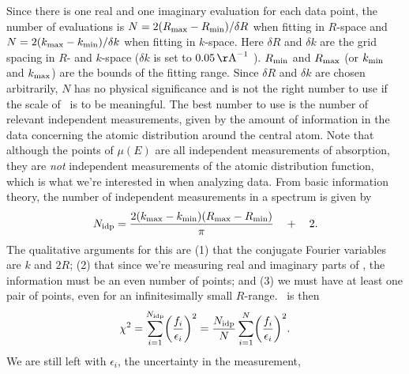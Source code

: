 Since there is one real and one imaginary evaluation for each data
point, the number of evaluations is $ N = { {2 (R_{\rm max} - R_{\rm
min})} / { \delta R } } $ when fitting in $R$-space and $ N = { {2
(k_{\rm max} - k_{\rm min})} / {\delta k } } $ when fitting in
$k$-space.  Here $\delta R$ and $\delta k$ are the grid spacing in
$R$- and $k$-space ($\delta k$ is set to $ 0.05\, {\rm \AA}^{-1}$ ).
$R_{\rm min}$ and $R_{\rm max}$ (or $k_{\rm min}$ and $k_{\rm max}$)
are the bounds of the fitting range.  Since $\delta R$ and $\delta k$
are chosen arbitrarily, $N$ has no physical significance and is not
the right number to use if the scale of \chisqr\ is to be meaningful.
The best number to use is the number of relevant independent
measurements, given by the amount of information in the data
concerning the atomic distribution around the central atom.  Note that
although the points of $\mu(E)$ are all independent measurements of
absorption, they are {\it not\/} independent measurements of the
atomic distribution function, which is what we're interested in when
analyzing data.  From basic information theory, the number of
independent measurements in a spectrum is given by 
\begin{equation}
 N_{\rm idp} = {{
2 (k_{\rm max} - k_{\rm min} ) (R_{\rm max} - R_{\rm min} )}
\over \pi } \quad + \quad 2 .
\end{equation}
\noindent 
The qualitative arguments for this are (1) that the conjugate Fourier
variables are $k$ and $2R$; (2) that since we're measuring real and
imaginary parts of \chir, the information must be an even number of
points; and (3) we must have at least one pair of points, even for an
infinitesimally small $R$-range.  \chisqr\ is then 
\begin{equation}
\chi^2 =
\sum_{i=1}^{N_{\rm idp} }
\biggl( { {f_i} \over {\epsilon_i} } \biggr)^2 = { {N_{\rm idp} } \over
N } \sum_{i=1}^{N} \biggl( { {f_i} \over {\epsilon_i} }
\biggr)^2. 
\end{equation}
\noindent
We are still left with $\epsilon_i$, the uncertainty in the measurement,
